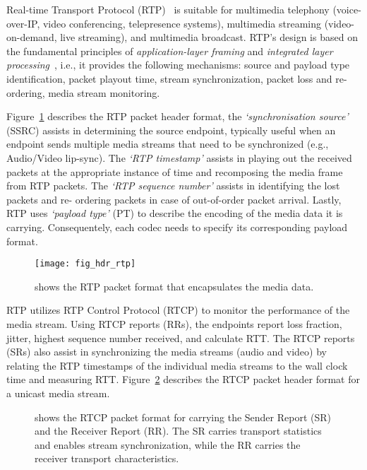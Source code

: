 
Real-time Transport Protocol (RTP)~\cite{rfc3550} is suitable for multimedia
telephony (voice-over-IP, video conferencing, telepresence systems),
multimedia streaming (video-on-demand, live streaming), and multimedia
broadcast. RTP's design is based on the fundamental principles of \textit
{application-layer framing} and \textit{integrated layer
processing}~\cite{clark:alf}, i.e., it provides the following mechanisms:
source and payload type identification, packet playout time, stream
synchronization, packet loss and re-ordering, media stream monitoring.

Figure~\ref{fig:3:rtp.hdr} describes the RTP packet header format, the
\textit{`synchronisation source'} (SSRC) assists in determining the source
endpoint, typically useful when an endpoint sends multiple media streams that
need to be synchronized (e.g., Audio/Video lip-sync). The \textit{`RTP
timestamp'} assists in playing out the received packets at the appropriate
instance of time and recomposing the media frame from RTP packets. The
\textit{`RTP sequence number'} assists in identifying the lost packets and re-
ordering packets in case of out-of-order packet arrival. Lastly, RTP uses
\textit{`payload type'} (PT) to describe the encoding of the media data it is
carrying. Consequentely, each codec needs to specify its corresponding payload
format.

\begin{figure}[!htbp]
\centerline{\texttt{[image: fig\_hdr\_rtp]}}
\caption{shows the RTP packet format that encapsulates the media data.}
\label{fig:3:rtp.hdr}
\end{figure}

RTP utilizes RTP Control Protocol (RTCP) to monitor the performance of the
media stream. Using RTCP reports (RRs), the endpoints report loss fraction,
jitter, highest sequence number received, and calculate RTT. The RTCP reports
(SRs) also assist in synchronizing the media streams (audio and video) by
relating the RTP timestamps of the individual media streams to the wall clock
time and measuring RTT. Figure~\ref{fig:3:rtcp.hdr} describes the RTCP packet
header format for a unicast media stream.

\begin{figure}
\caption{shows the RTCP packet format for carrying the Sender Report (SR) and
the Receiver Report (RR). The SR carries transport statistics and enables 
stream synchronization, while the RR carries the receiver transport 
characteristics.}
\label{fig:3:rtcp.hdr}
\end{figure}


